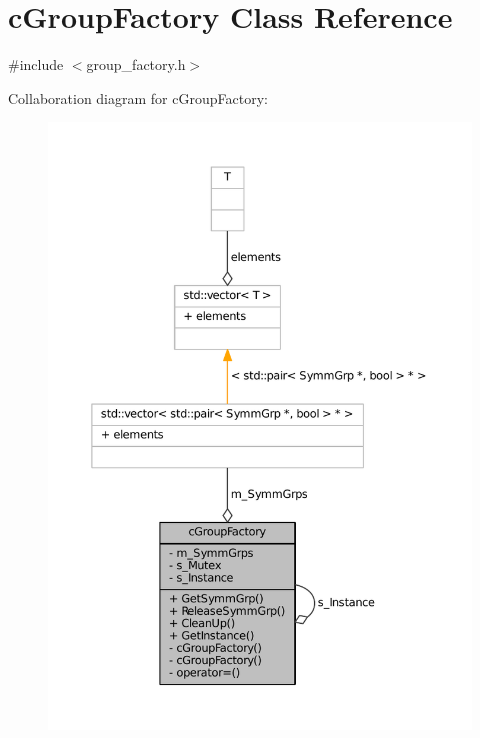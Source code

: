 \hypertarget{classcGroupFactory}{\section{c\-Group\-Factory \-Class \-Reference}
\label{classcGroupFactory}
}


{\ttfamily \#include $<$group\-\_\-factory.\-h$>$}



\-Collaboration diagram for c\-Group\-Factory\-:
\nopagebreak
\begin{figure}[H]
\begin{center}
\leavevmode
\includegraphics[width=350pt]{classcGroupFactory__coll__graph}
\end{center}
\end{figure}
